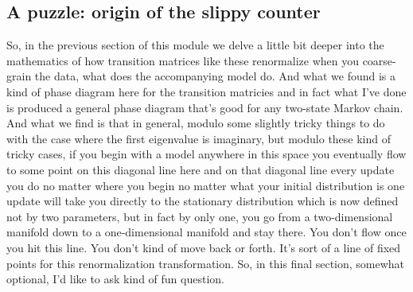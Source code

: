 \documentclass[]{article}
\begin{document}
\subsection{A puzzle: origin of the slippy counter}

So, in the previous section of this module
we delve a little bit deeper into the mathematics
of how transition matrices like these
renormalize when you coarse-grain the data,
what does the accompanying model do.
And what we found is a kind of phase diagram here
for the transition matricies
and in fact what I've done is produced a general phase diagram
that's good for any two-state Markov chain.
And what we find is that in general,
modulo some slightly tricky
things to do with the case
where the first eigenvalue is imaginary,
but modulo these kind of tricky cases,
if you begin with a model anywhere in this space
you eventually flow to some point on
this diagonal line here
and on that diagonal line every update you do
no matter where you begin
no matter what your initial distribution is
one update will take you directly
to the stationary distribution which is
now defined not by two parameters,
but in fact by only one,
you go from a two-dimensional manifold
down to a one-dimensional manifold
and stay there.
You don't flow once you hit this line.
You don't kind of move back or forth.
It's sort of a line of fixed points
for this renormalization transformation.
So, in this final section,
somewhat optional,
I'd like to ask kind of fun question.
\end{document}
